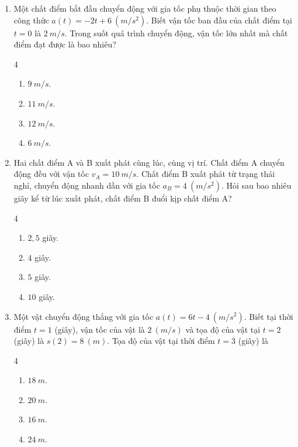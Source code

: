 \documentclass[12pt]{article}
\begin{document}
\begin{enumerate}[label=\textbf{Câu \arabic*.}]
		\item Một chất điểm bắt đầu chuyển động với gia tốc phụ thuộc thời gian theo công thức $a(t) = -2t + 6 \ (m/s^2)$. Biết vận tốc ban đầu của chất điểm tại $t=0$ là $2 \ m/s$. Trong suốt quá trình chuyển động, vận tốc lớn nhất mà chất điểm đạt được là bao nhiêu?
		\begin{multicols}{4}
			\begin{enumerate}[label=\textbf{\Alph*.}]
				\item $9 \ m/s$.
				\item $11 \ m/s$.
				\item $12 \ m/s$.
				\item $6 \ m/s$.
			\end{enumerate}
		\end{multicols}
		
		\item Hai chất điểm A và B xuất phát cùng lúc, cùng vị trí. Chất điểm A chuyển động đều với vận tốc $v_A = 10 \ m/s$. Chất điểm B xuất phát từ trạng thái nghỉ, chuyển động nhanh dần với gia tốc $a_B = 4 \ (m/s^2)$. Hỏi sau bao nhiêu giây kể từ lúc xuất phát, chất điểm B đuổi kịp chất điểm A?
		\begin{multicols}{4}
			\begin{enumerate}[label=\textbf{\Alph*.}]
				\item $2,5$ giây.
				\item $4$ giây.
				\item $5$ giây.
				\item $10$ giây.
			\end{enumerate}
		\end{multicols}
		
		\item Một vật chuyển động thẳng với gia tốc $a(t) = 6t - 4 \ (m/s^2)$. Biết tại thời điểm $t = 1$ (giây), vận tốc của vật là $2 \ (m/s)$ và tọa độ của vật tại $t = 2$ (giây) là $s(2) = 8 \ (m)$. Tọa độ của vật tại thời điểm $t = 3$ (giây) là
		\begin{multicols}{4}
			\begin{enumerate}[label=\textbf{\Alph*.}]
				\item $18 \ m$.
				\item $20 \ m$.
				\item $16 \ m$.
				\item $24 \ m$.
			\end{enumerate}
		\end{multicols}
		

\end{enumerate}
\end{document}
